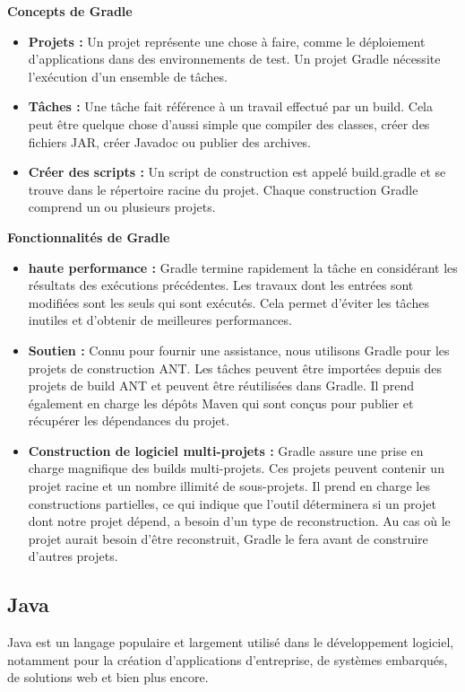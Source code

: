 \par \textbf{Concepts de Gradle}
\begin{itemize}
\item  \textbf{Projets :}
Un projet représente une chose à faire, comme le déploiement d'applications dans des environnements de test. Un projet Gradle nécessite l'exécution d'un ensemble de tâches.

\item \textbf{Tâches :}
Une tâche fait référence à un travail effectué par un build. Cela peut être quelque chose d'aussi simple que compiler des classes, créer des fichiers JAR, créer Javadoc ou publier des archives.

\item  \textbf{Créer des scripts :}
Un script de construction est appelé build.gradle et se trouve dans le répertoire racine du projet. Chaque construction Gradle comprend un ou plusieurs projets.
\end{itemize}

\par \textbf{Fonctionnalités de Gradle}
\begin{itemize}
\item  \textbf{haute performance :}
Gradle termine rapidement la tâche en considérant les résultats des exécutions précédentes. Les travaux dont les entrées sont modifiées sont les seuls qui sont exécutés. Cela permet d'éviter les tâches inutiles et d'obtenir de meilleures performances.

\item  \textbf{Soutien :}
Connu pour fournir une assistance, nous utilisons Gradle pour les projets de construction ANT. Les tâches peuvent être importées depuis des projets de build ANT et peuvent être réutilisées dans Gradle. Il prend également en charge les dépôts Maven qui sont conçus pour publier et récupérer les dépendances du projet.

\item  \textbf{Construction de logiciel multi-projets :}
Gradle assure une prise en charge magnifique des builds multi-projets. Ces projets peuvent contenir un projet racine et un nombre illimité de sous-projets. Il prend en charge les constructions partielles, ce qui indique que l'outil déterminera si un projet dont notre projet dépend, a besoin d'un type de reconstruction. Au cas où le projet aurait besoin d'être reconstruit, Gradle le fera avant de construire d'autres projets.
\end{itemize}


\subsection*{Java}
Java est un langage populaire et largement utilisé dans le développement logiciel, notamment pour la création d'applications d'entreprise, de systèmes embarqués, de solutions web et bien plus encore.\\


